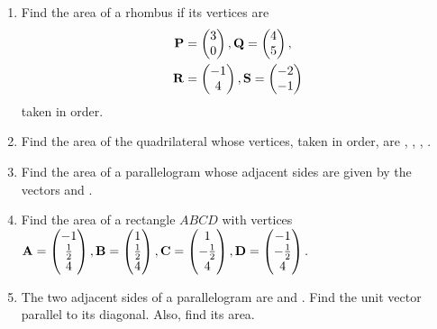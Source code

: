 \documentclass[journal,12pt,twocolumn]{IEEEtran}
\renewcommand\thesection{\arabic{section}}
\begin{document}
\begin{enumerate}[label=\thesection.\arabic*.,ref=\thesection.\theenumi]
\item Find the area of a rhombus if its vertices are 
\begin{align}
\mathbf{P} &= \begin{pmatrix}3\\0\end{pmatrix}, \mathbf{Q} =\begin{pmatrix}4\\5\end{pmatrix},
\\
\mathbf{R} &= \begin{pmatrix}-1\\4\end{pmatrix}, \mathbf{S} = \begin{pmatrix}-2\\-1\end{pmatrix} 
\end{align}
taken in order.
\\
\solution
%

\item  Find the area of the quadrilateral whose vertices, taken in order, are 
 ,  ,  ,  . 
\\
\solution
%
\item Find the area of a parallelogram whose adjacent sides are given by the vectors  and .
\\
\solution
%
\item Find the area of a rectangle $ABCD$ with vertices
$\mathbf{A} = \begin{pmatrix}-1\\\frac{1}{2}\\ 4\end{pmatrix},
 \mathbf{B} = \begin{pmatrix}1\\\frac{1}{2}\\ 4\end{pmatrix},
\mathbf{C} = \begin{pmatrix}1\\-\frac{1}{2}\\ 4\end{pmatrix},
\mathbf{D} = \begin{pmatrix}-1\\-\frac{1}{2}\\ 4\end{pmatrix}.
$
\\
\solution
%
\item The two adjacent sides of a parallelogram are  and  . Find the unit vector parallel to its diagonal.  Also, find its area.
%
\\
\solution
%


\end{enumerate}
\end{document}
